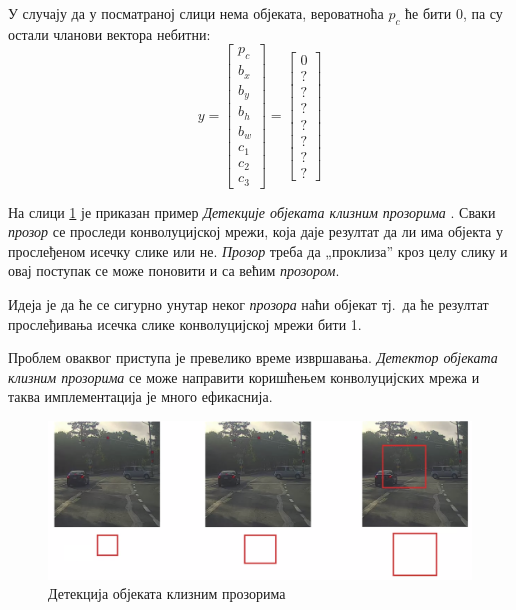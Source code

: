 \documentclass[12pt, а4paper]{article}
\begin{document}
У случају да у посматраној слици нема објеката, вероватноћа $p_c$ ће бити
0, па су остали чланови вектора небитни:
\begin{equation}
y =
\begin{bmatrix}
 p_c \\
 b_x \\
 b_y \\
 b_h \\
 b_w \\
 c_1 \\
 c_2 \\
 c_3
\end{bmatrix}
=
\begin{bmatrix}
 0 \\
 ? \\
 ? \\
 ? \\
 ? \\
 ? \\
 ? \\
 ?
\end{bmatrix}
\label{eq:detNoResKl}
\end{equation}

На слици \ref{fig:ng_slidW} је приказан пример
\textit{Детекције објеката клизним прозорима} \cite{ngObjDet}.
Сваки \textit{прозор} се проследи конволуцијској мрежи, која
даје резултат да ли има објекта у прослеђеном исечку слике
или не. \textit{Прозор} треба да „проклиза” кроз целу слику
и овај поступак се може поновити и са већим
\textit{прозором}.

Идеја је да ће се сигурно унутар неког \textit{прозора}
наћи објекат тј.\ да ће резултат прослеђивања исечка слике
конволуцијској мрежи бити 1.

Проблем оваквог приступа је превелико време извршавања.
\textit{Детектор објеката клизним прозорима} се може
направити коришћењем конволуцијских мрежа и таква
имплементација је много ефикаснија.


\begin{figure}[H]
  \centering
      \includegraphics[scale=0.3]{slike/slidW.png}
  \caption{Детекција објеката клизним прозорима}
  \label{fig:ng_slidW}
\end{figure}
\end{document}
